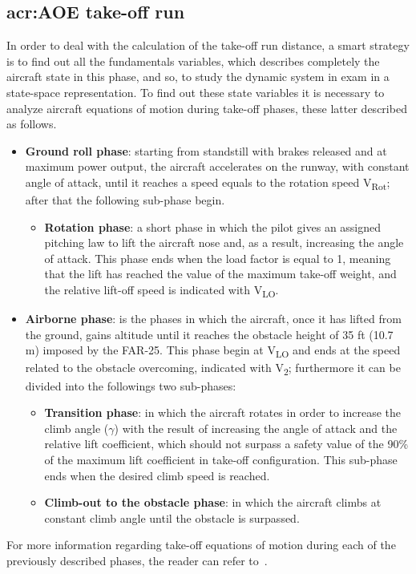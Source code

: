 \subsection{\gls{acr:AOE} take-off run}
In order to deal with the calculation of the take-off run distance, a smart strategy is to find out all the fundamentals variables, which describes completely the aircraft state in this phase, and so, to study the dynamic system in exam in a state-space representation.
%
\noindent
To find out these state variables it is necessary to analyze aircraft equations of motion during take-off phases, these latter described as follows.
\begin{itemize}
\item \textbf{Ground roll phase}: starting from standstill with brakes released and at maximum power output, the aircraft accelerates on the runway, with constant angle of attack, until it reaches a speed equals to the rotation speed V\textsubscript{Rot}; after that the following sub-phase begin.
%
\begin{itemize}
\item \textbf{Rotation phase}: a short phase in which the pilot gives an assigned pitching law to lift the aircraft nose and, as a result, increasing the angle of attack. This phase ends when the load factor is equal to 1, meaning that the lift has reached the value of the maximum take-off weight, and the relative lift-off speed is indicated with V\textsubscript{LO}. 
%
\end{itemize}
%
\item \textbf{Airborne phase}: is the phases in which the aircraft, once it has lifted from the ground, gains altitude until it reaches the obstacle height of 35 \si{ft} (10.7 \si{\meter}) imposed by the \gls{FAR}-25. This phase begin at V\textsubscript{LO} and ends at the speed related to the obstacle overcoming, indicated with V\textsubscript{2}; furthermore it can be divided into the followings two sub-phases:
%
\begin{itemize}
\item \textbf{Transition phase}: in which the aircraft rotates in order to increase the climb angle ($\gamma$) with the result of increasing the angle of attack and the relative lift coefficient, which should not surpass a safety value of the 90\% of the maximum lift coefficient in take-off configuration. This sub-phase ends when the desired climb speed is reached.
%
\item \textbf{Climb-out to the obstacle phase}: in which the aircraft climbs at constant climb angle until the obstacle is surpassed.
\end{itemize}
\end{itemize}
%
\noindent
For more information regarding take-off equations of motion during each of the previously described phases, the reader can refer to~\cite{McCormick}.

